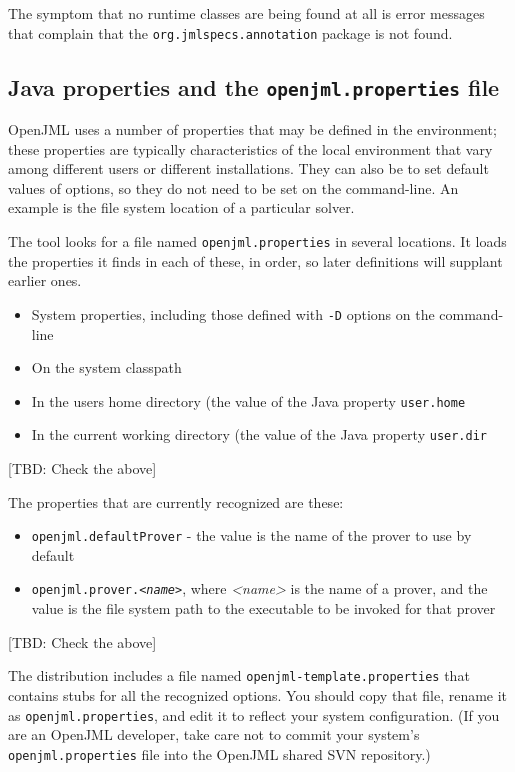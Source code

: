 The symptom that no runtime classes are being found at all is error messages that complain that
the {\tt org.jmlspecs.annotation} package is not found.


\subsection{Java properties and the {\tt openjml.properties} file}

OpenJML uses a number of properties that may be defined in the environment;
these properties are typically characteristics of the local environment that vary among different users or different installations. 
They can also be to set default values of options, so they do not need to be set on the command-line. An example is the file system location of a particular solver.

The tool looks for a file named {\tt openjml.properties} in several locations. It loads the
properties it finds in each of these, in order, so later definitions will supplant earlier ones.
\begin{itemize}\nospace
\item System properties, including those defined with {\tt -D} options on the command-line
\item On the system classpath
\item In the users home directory (the value of the Java property {\tt user.home}
\item In the current working directory (the value of the Java property {\tt user.dir}
\end{itemize}
[TBD: Check the above]

The properties that are currently recognized are these:
\begin{itemize}\nospace
\item {\tt openjml.defaultProver} - the value is the name of the prover to use by default
\item {\tt openjml.prover.{\it <name>}}, where {\it <name>} is the name of a prover, and
the value is the file system path to the executable to be invoked for that prover
\end{itemize}
[TBD: Check the above]

The distribution includes a file named {\tt openjml-template.properties} that contains stubs for all the recognized options.
You should copy that file, rename it as {\tt openjml.properties}, and edit it to reflect your system configuration.
(If you are an OpenJML developer, take care not to commit your system's {\tt openjml.properties} file into the OpenJML shared SVN repository.)

